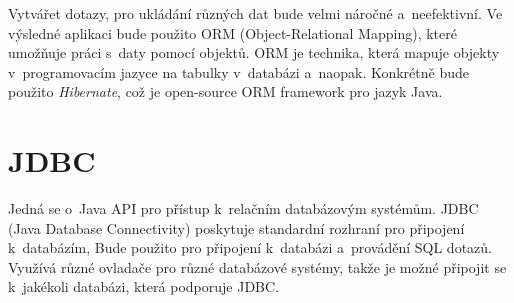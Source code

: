 Vytvářet dotazy, pro ukládání různých dat bude velmi náročné a~neefektivní.
Ve výsledné aplikaci bude použito ORM (Object-Relational Mapping), které umožňuje práci s~daty pomocí objektů.
ORM je technika, která mapuje objekty v~programovacím jazyce na tabulky v~databázi a~naopak.
Konkrétně bude použito \textit{Hibernate}, což je open-source ORM framework pro jazyk Java.

\section{JDBC}
Jedná se o~Java API pro přístup k~relačním databázovým systémům.
JDBC (Java Database Connectivity) poskytuje standardní rozhraní pro připojení k~databázím,
Bude použito pro připojení k~databázi a~provádění SQL dotazů.
Využívá různé ovladače pro různé databázové systémy, takže je možné připojit se k~jakékoli databázi,
která podporuje JDBC. 